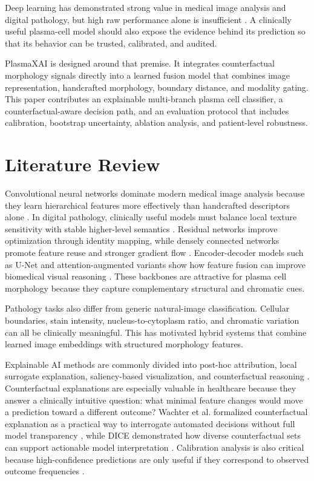 \documentclass[runningheads]{llncs}
\begin{document}
Deep learning has demonstrated strong value in medical image analysis and digital pathology, but high raw performance alone is insufficient \cite{litjens,bera,campanella}. A clinically useful plasma-cell model should also expose the evidence behind its prediction so that its behavior can be trusted, calibrated, and audited.

PlasmaXAI is designed around that premise. It integrates counterfactual morphology signals directly into a learned fusion model that combines image representation, handcrafted morphology, boundary distance, and modality gating. This paper contributes an explainable multi-branch plasma cell classifier, a counterfactual-aware decision path, and an evaluation protocol that includes calibration, bootstrap uncertainty, ablation analysis, and patient-level robustness.

\section{Literature Review}
Convolutional neural networks dominate modern medical image analysis because they learn hierarchical features more effectively than handcrafted descriptors alone \cite{litjens,janowczyk}. In digital pathology, clinically useful models must balance local texture sensitivity with stable higher-level semantics \cite{bera,campanella}. Residual networks improve optimization through identity mapping, while densely connected networks promote feature reuse and stronger gradient flow \cite{resnet,densenet}. Encoder-decoder models such as U-Net and attention-augmented variants show how feature fusion can improve biomedical visual reasoning \cite{unet,attentionunet}. These backbones are attractive for plasma cell morphology because they capture complementary structural and chromatic cues.

Pathology tasks also differ from generic natural-image classification. Cellular boundaries, stain intensity, nucleus-to-cytoplasm ratio, and chromatic variation can all be clinically meaningful. This has motivated hybrid systems that combine learned image embeddings with structured morphology features.

Explainable AI methods are commonly divided into post-hoc attribution, local surrogate explanation, saliency-based visualization, and counterfactual reasoning \cite{lime,gradcam,shap,wachter}. Counterfactual explanations are especially valuable in healthcare because they answer a clinically intuitive question: what minimal feature changes would move a prediction toward a different outcome? Wachter et al. formalized counterfactual explanation as a practical way to interrogate automated decisions without full model transparency \cite{wachter}, while DICE demonstrated how diverse counterfactual sets can support actionable model interpretation \cite{diceml}. Calibration analysis is also critical because high-confidence predictions are only useful if they correspond to observed outcome frequencies \cite{calibration}.
\end{document}
